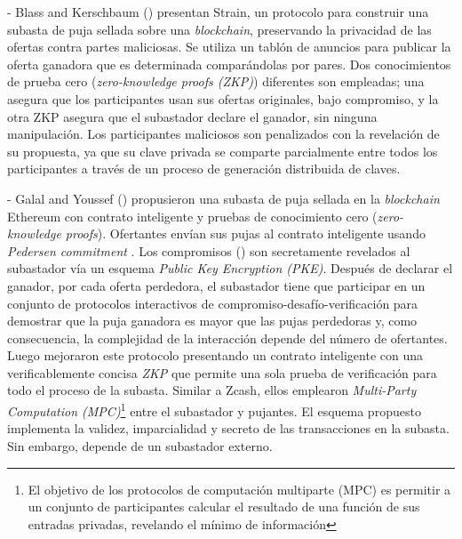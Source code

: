     - Blass and Kerschbaum (\citeyear{blass2017strain}) presentan Strain, un protocolo para construir una subasta de puja sellada sobre
    una \textit{blockchain}, preservando la privacidad de las ofertas contra partes maliciosas. Se utiliza un tablón
    de anuncios para publicar la oferta ganadora que es determinada comparándolas por pares. Dos 
    conocimientos de prueba cero (\textit{zero-knowledge proofs (ZKP)}) diferentes son empleadas; una 
    asegura que los 
    participantes usan sus ofertas originales, bajo compromiso, y la otra ZKP asegura que el
    subastador declare el ganador, sin ninguna manipulación. 
    Los participantes maliciosos son penalizados con la revelación de su propuesta, ya que su clave privada 
    se comparte parcialmente entre todos los participantes a través de un proceso de generación distribuida
    de claves.


    - Galal and Youssef (\citeyear{galalyusef2018a}) propusieron una subasta de puja sellada en la \textit{blockchain} Ethereum con contrato 
    inteligente y pruebas de conocimiento cero (\textit{zero-knowledge proofs}). Ofertantes envían sus pujas al contrato inteligente usando
    \textit{Pedersen commitment} \parencite{pedersen1991}. Los compromisos () son secretamente revelados al subastador vía
    un esquema \textit{Public Key Encryption (PKE)}. Después de declarar el ganador, por cada oferta 
    perdedora, el subastador tiene que
    participar en un conjunto de protocolos interactivos de compromiso-desafío-verificación para demostrar 
    que la puja ganadora es mayor que 
    las pujas perdedoras y, como consecuencia, la complejidad de la interacción depende del número de ofertantes. Luego 
    \parencite{galalyusef2018b} mejoraron este protocolo presentando un contrato inteligente con una verificablemente concisa \textit{ZKP}
    que permite una sola prueba de verificación para todo el proceso de la subasta. Similar a Zcash, ellos emplearon \textit{Multi-Party 
    Computation (MPC)}\footnote{El objetivo de los protocolos de computación multiparte (MPC) es
    permitir a un conjunto de participantes calcular el resultado
    de una función de sus entradas privadas, revelando el mínimo
    de información} entre el subastador y pujantes. El esquema propuesto implementa la validez, imparcialidad
    y secreto de las transacciones en la subasta. Sin embargo, depende de un subastador externo.
    
